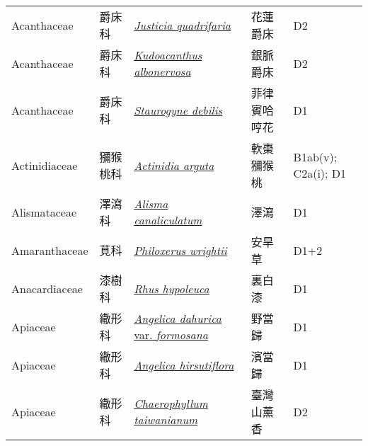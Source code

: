 {\begin{longtable}{p{2.5cm}p{2.5cm}p{4.5cm}p{2.5cm}p{3cm}}
    Acanthaceae & 爵床科 & \href{http://www.theplantlist.org/tpl1.1/search?q=Justicia+quadrifaria}{\textit{Justicia quadrifaria} } & 花蓮爵床 & D2 \index{Justicia@\textit{Justicia}!quadrifaria@\textit{quadrifaria}}  \index{花蓮爵床} \\
    Acanthaceae & 爵床科 & \href{http://www.theplantlist.org/tpl1.1/search?q=Kudoacanthus+albonervosa}{\textit{Kudoacanthus albonervosa} } & 銀脈爵床 & D2 \index{Kudoacanthus@\textit{Kudoacanthus}!albonervosa@\textit{albonervosa}}  \index{銀脈爵床} \\
    Acanthaceae & 爵床科 & \href{http://www.theplantlist.org/tpl1.1/search?q=Staurogyne+debilis}{\textit{Staurogyne debilis} } & 菲律賓哈哼花 & D1 \index{Staurogyne@\textit{Staurogyne}!debilis@\textit{debilis}}  \index{菲律賓哈哼花} \\
    Actinidiaceae & 獼猴桃科 & \href{http://www.theplantlist.org/tpl1.1/search?q=Actinidia+arguta}{\textit{Actinidia arguta} } & 軟棗獼猴桃 & B1ab(v); C2a(i); D1 \index{Actinidia@\textit{Actinidia}!arguta@\textit{arguta}}  \index{軟棗獼猴桃} \\
    Alismataceae & 澤瀉科 & \href{http://www.theplantlist.org/tpl1.1/search?q=Alisma+canaliculatum}{\textit{Alisma canaliculatum} } & 澤瀉 & D1 \index{Alisma@\textit{Alisma}!canaliculatum@\textit{canaliculatum}}  \index{澤瀉} \\
    Amaranthaceae & 莧科 & \href{http://www.theplantlist.org/tpl1.1/search?q=Philoxerus+wrightii}{\textit{Philoxerus wrightii} } & 安旱草 & D1+2 \index{Philoxerus@\textit{Philoxerus}!wrightii@\textit{wrightii}}  \index{安旱草} \\
    Anacardiaceae & 漆樹科 & \href{http://www.theplantlist.org/tpl1.1/search?q=Rhus+hypoleuca}{\textit{Rhus hypoleuca} } & 裏白漆 & D1 \index{Rhus@\textit{Rhus}!hypoleuca@\textit{hypoleuca}}  \index{裏白漆} \\
    Apiaceae & 繖形科 & \href{http://www.theplantlist.org/tpl1.1/search?q=Angelica+dahurica+var.+formosana}{\textit{Angelica dahurica} var. \textit{formosana} } & 野當歸 & D1 \index{Angelica@\textit{Angelica}!dahurica@\textit{dahurica}!var. formosana@var. \textit{formosana}}  \index{野當歸} \\
    Apiaceae & 繖形科 & \href{http://www.theplantlist.org/tpl1.1/search?q=Angelica+hirsutiflora}{\textit{Angelica hirsutiflora} } & 濱當歸 & D1 \index{Angelica@\textit{Angelica}!hirsutiflora@\textit{hirsutiflora}}  \index{濱當歸} \\
    Apiaceae & 繖形科 & \href{http://www.theplantlist.org/tpl1.1/search?q=Chaerophyllum+taiwanianum}{\textit{Chaerophyllum taiwanianum} } & 臺灣山薰香 & D2 \index{Chaerophyllum@\textit{Chaerophyllum}!taiwanianum@\textit{taiwanianum}}  \index{臺灣山薰香} \\

\end{longtable}}
